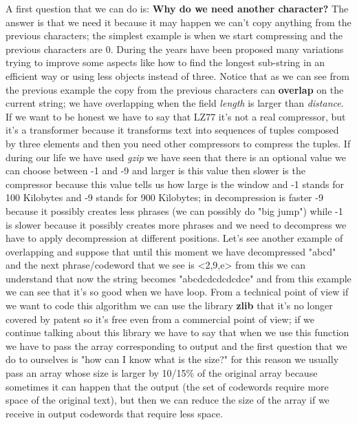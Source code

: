 A first question that we can do is: \textbf{Why do we need another character?} The answer is that we need it because it may happen we can't copy anything from the previous characters; the simplest example is when we start compressing and the previous characters are 0.\newline
During the years have been proposed many variations trying to improve some aspects like how to find the longest sub-string in an efficient way or using less objects instead of three.\newline
Notice that as we can see from the previous example the copy from the previous characters can \textbf{overlap} on the current string; we have overlapping when the field \textit{length} is larger than \textit{distance}.\newline
If we want to be honest we have to say that LZ77 it's not a real compressor, but it's a transformer because it transforms text into sequences of tuples composed by three elements and then you need other compressors to compress the tuples.\newline
If during our life we have used \textit{gzip} we have seen that there is an optional value we can choose between -1 and -9 and larger is this value then slower is the compressor because this value tells us how large is the window and -1 stands for 100 Kilobytes and -9 stands for 900 Kilobytes; in decompression is faster -9 because it possibly creates less phrases (we can possibly do "big jump") while -1 is slower because it possibly creates more phrases and we need to decompress we have to apply decompression at different positions.\newline
Let's see another example of overlapping and suppose that until this moment we have decompressed "abcd" and the next phrase/codeword that we see is <2,9,e> from this we can understand that now the string becomes "abcdcdcdcdcdce" and from this example we can see that it's so good when we have loop.\newline
From a technical point of view if we want to code this algorithm we can use the library \textbf{zlib} that it's no longer covered by patent so it's free even from a commercial point of view; if we continue talking about this library we have to say that when we use this function we have to pass the array corresponding to output and the first question that we do to ourselves is "how can I know what is the size?" for this reason we usually pass an array whose size is larger by 10/15\% of the original array because sometimes it can happen that the output (the set of codewords require more space of the original text), but then we can reduce the size of the array if we receive in output codewords that require less space.\newline


